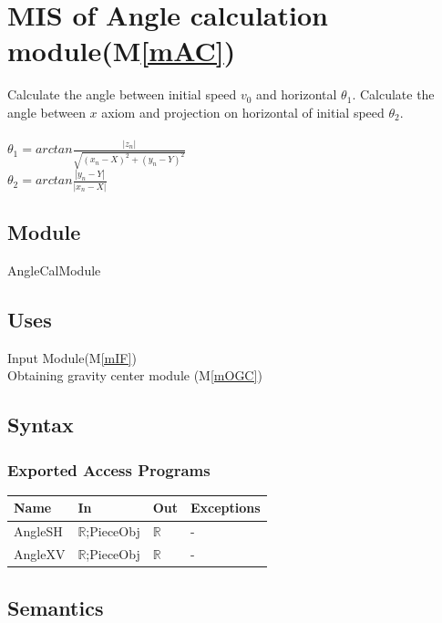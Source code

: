 \documentclass[12pt, titlepage]{article}
\newcommand{\mref}[1]{M\ref{#1}}
\begin{document}
\section{MIS of Angle calculation module(\mref{mAC})} 
Calculate the angle between initial speed $v_{0}$ and horizontal $\theta_{1}$. Calculate the angle between $x$ axiom and projection on horizontal of initial speed $\theta_{2}$. \\
\\
$\theta_{1}=arctan \frac{|z_{n}|}{\sqrt{(x_{n}-X)^2+(y_{n}-Y)^2}}$\\
$\theta_{2}=arctan \frac{|y_{n}-Y|}{|x_{n}-X|}$
\subsection{Module}

AngleCalModule

\subsection{Uses}

Input Module(\mref{mIF})\\
Obtaining gravity center module (\mref{mOGC})

\subsection{Syntax}

\subsubsection{Exported Access Programs}

\begin{center}
	\begin{tabular}{p{2cm} p{4cm} p{4cm} p{2cm}}
		\hline
		\textbf{Name} & \textbf{In} & \textbf{Out} & \textbf{Exceptions} \\
		\hline
		AngleSH & $\mathbb{R}$;PieceObj & $\mathbb{R}$ & - \\
		AngleXV & $\mathbb{R}$;PieceObj & $\mathbb{R}$ & - \\
		\hline
	\end{tabular}
\end{center}

\subsection{Semantics}
\end{document}
